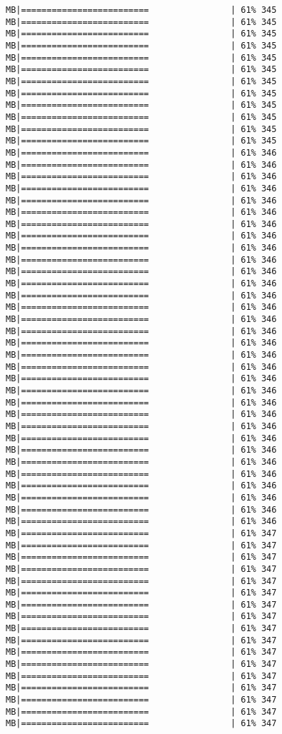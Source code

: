 \documentclass[
]{article}
\begin{document}
\begin{verbatim}
MB|=========================                | 61% 345 MB|=========================                | 61% 345 MB|=========================                | 61% 345 MB|=========================                | 61% 345 MB|=========================                | 61% 345 MB|=========================                | 61% 345 MB|=========================                | 61% 345 MB|=========================                | 61% 345 MB|=========================                | 61% 345 MB|=========================                | 61% 345 MB|=========================                | 61% 345 MB|=========================                | 61% 345 MB|=========================                | 61% 346 MB|=========================                | 61% 346 MB|=========================                | 61% 346 MB|=========================                | 61% 346 MB|=========================                | 61% 346 MB|=========================                | 61% 346 MB|=========================                | 61% 346 MB|=========================                | 61% 346 MB|=========================                | 61% 346 MB|=========================                | 61% 346 MB|=========================                | 61% 346 MB|=========================                | 61% 346 MB|=========================                | 61% 346 MB|=========================                | 61% 346 MB|=========================                | 61% 346 MB|=========================                | 61% 346 MB|=========================                | 61% 346 MB|=========================                | 61% 346 MB|=========================                | 61% 346 MB|=========================                | 61% 346 MB|=========================                | 61% 346 MB|=========================                | 61% 346 MB|=========================                | 61% 346 MB|=========================                | 61% 346 MB|=========================                | 61% 346 MB|=========================                | 61% 346 MB|=========================                | 61% 346 MB|=========================                | 61% 346 MB|=========================                | 61% 346 MB|=========================                | 61% 346 MB|=========================                | 61% 346 MB|=========================                | 61% 346 MB|=========================                | 61% 347 MB|=========================                | 61% 347 MB|=========================                | 61% 347 MB|=========================                | 61% 347 MB|=========================                | 61% 347 MB|=========================                | 61% 347 MB|=========================                | 61% 347 MB|=========================                | 61% 347 MB|=========================                | 61% 347 MB|=========================                | 61% 347 MB|=========================                | 61% 347 MB|=========================                | 61% 347 MB|=========================                | 61% 347 MB|=========================                | 61% 347 MB|=========================                | 61% 347 MB|=========================                | 61% 347 MB|=========================                | 61% 347 
\end{verbatim}
\end{document}
